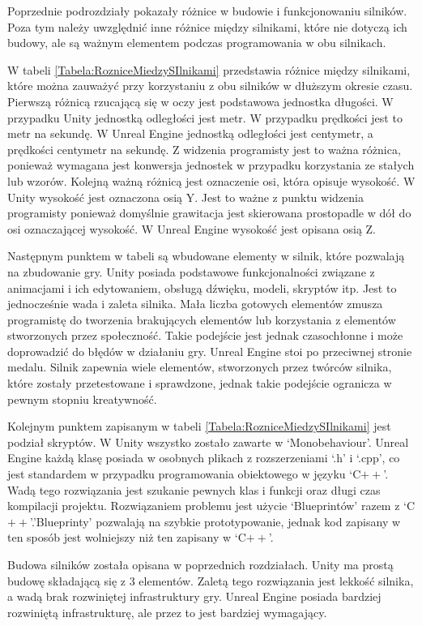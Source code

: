 \documentclass[12pt,twoside]{article}
\begin{document}
Poprzednie podrozdziały pokazały różnice w budowie i funkcjonowaniu silników.
Poza tym należy uwzględnić inne różnice między silnikami, które nie dotyczą ich
budowy, ale są ważnym elementem podczas programowania w obu silnikach. 

W tabeli \ref{Tabela:RozniceMiedzySIlnikami} przedstawia różnice między
silnikami, które można zauważyć przy korzystaniu z obu silników w dłuższym
okresie czasu. Pierwszą różnicą rzucającą się w oczy jest podstawowa jednostka
długości. W przypadku Unity jednostką odległości jest metr. W przypadku
prędkości jest to metr na sekundę. W Unreal Engine jednostką odległości jest
centymetr, a prędkości centymetr na sekundę. Z widzenia programisty jest to
ważna różnica, ponieważ wymagana jest konwersja jednostek w przypadku
korzystania ze stałych lub wzorów. Kolejną ważną różnicą jest oznaczenie osi,
która opisuje wysokość. W Unity wysokość jest oznaczona osią Y. Jest to ważne z
punktu widzenia programisty ponieważ domyślnie grawitacja jest skierowana
prostopadle w dół do osi oznaczającej wysokość. W Unreal Engine wysokość jest
opisana osią Z. 

Następnym punktem w tabeli są wbudowane elementy w silnik, które pozwalają na
zbudowanie gry. Unity posiada podstawowe funkcjonalności związane z animacjami i
ich edytowaniem, obsługą dźwięku, modeli, skryptów itp. Jest to jednocześnie
wada i zaleta silnika. Mała liczba gotowych elementów zmusza programistę do tworzenia
brakujących elementów lub korzystania z elementów stworzonych przez społeczność.
Takie podejście jest jednak czasochłonne i może doprowadzić do błędów w
działaniu gry. Unreal Engine stoi po przeciwnej stronie medalu. Silnik zapewnia
wiele elementów, stworzonych przez twórców silnika, które zostały przetestowane
i sprawdzone, jednak takie podejście ogranicza w pewnym stopniu kreatywność. 

Kolejnym punktem zapisanym w tabeli \ref{Tabela:RozniceMiedzySIlnikami} jest
podział skryptów. W Unity wszystko zostało zawarte w ‘Monobehaviour’. Unreal
Engine każdą klasę posiada w osobnych plikach z rozszerzeniami ‘.h’ i ‘.cpp’, co
jest standardem w przypadku programowania obiektowego w języku ‘C$++$’. Wadą
tego rozwiązania jest szukanie pewnych klas i funkcji oraz długi czas kompilacji
projektu. Rozwiązaniem problemu jest użycie ‘Blueprintów’ razem z
‘C$++$’.’Blueprinty’ pozwalają na szybkie prototypowanie, jednak kod zapisany w
ten sposób jest wolniejszy niż ten zapisany w ‘C$++$’.


Budowa silników została opisana w poprzednich rozdziałach. Unity ma prostą
budowę składającą się z 3 elementów. Zaletą tego rozwiązania jest lekkość
silnika, a wadą brak rozwiniętej infrastruktury gry. Unreal Engine posiada
bardziej rozwiniętą infrastrukturę, ale przez to jest bardziej wymagający. 
\end{document}
